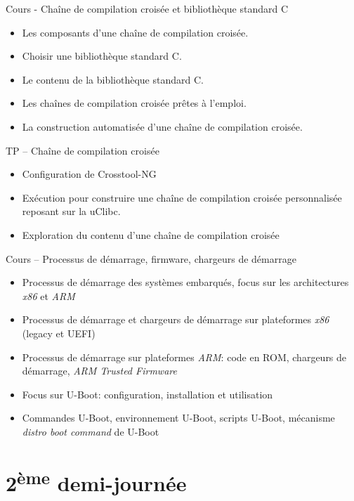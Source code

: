 \documentclass[a4paper,12pt,obeyspaces,spaces,hyphens]{article}
\begin{document}
\feagendatwocolumn
{Cours - Chaîne de compilation croisée et bibliothèque standard C}
{
  \begin{itemize}
  \item Les composants d'une chaîne de compilation croisée.
  \item Choisir une bibliothèque standard C.
  \item Le contenu de la bibliothèque standard C.
  \item Les chaînes de compilation croisée prêtes à l'emploi.
  \item La construction automatisée d'une chaîne de compilation croisée.
  \end{itemize}
}
{TP – Chaîne de compilation croisée}
{
  \begin{itemize}
  \item Configuration de Crosstool-NG
  \item Exécution pour construire une chaîne de compilation croisée
    personnalisée reposant sur la uClibc.
  \item Exploration du contenu d'une chaîne de compilation croisée
  \end{itemize}
}

\feagendaonecolumn
{Cours – Processus de démarrage, firmware, chargeurs de démarrage}
{
  \begin{itemize}
  \item Processus de démarrage des systèmes embarqués, focus sur les
    architectures {\em x86} et {\em ARM}
  \item Processus de démarrage et chargeurs de démarrage sur
    plateformes {\em x86} (legacy et UEFI)
  \item Processus de démarrage sur plateformes {\em ARM}: code en ROM,
    chargeurs de démarrage, {\em ARM Trusted Firmware}
  \item Focus sur U-Boot: configuration, installation et utilisation
  \item Commandes U-Boot, environnement U-Boot, scripts U-Boot,
    mécanisme {\em distro boot command} de U-Boot
  \end{itemize}
}

\section{2\textsuperscript{ème} demi-journée}
\end{document}
